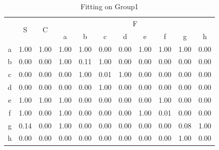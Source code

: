 \begin{table}[]
\centering
\begin{tabular}{c|c|c|cccccccc}
\toprule
\multirow{2}{*}{} & \multirow{2}{*}{S} & \multirow{2}{*}{C} & \multicolumn{8}{c}{F}                                 \\ \cmidrule{4-11}
                  &                    &                    & a    & b    & c    & d    & e    & f    & g    & h    \\ \midrule
a                 & 1.00               & 1.00               & 1.00 & 1.00 & 0.00 & 0.00 & 1.00 & 1.00 & 1.00 & 0.00 \\
b                 & 0.00               & 0.00               & 1.00 & 0.11 & 1.00 & 0.00 & 0.00 & 0.00 & 0.00 & 0.00 \\
c                 & 0.00               & 0.00               & 0.00 & 1.00 & 0.01 & 1.00 & 0.00 & 0.00 & 0.00 & 0.00 \\
d                 & 0.00               & 0.00               & 0.00 & 0.00 & 1.00 & 0.00 & 0.00 & 0.00 & 0.00 & 0.00 \\
e                 & 1.00               & 1.00               & 1.00 & 0.00 & 0.00 & 0.00 & 0.00 & 1.00 & 0.00 & 0.00 \\
f                 & 1.00               & 0.00               & 1.00 & 0.00 & 0.00 & 0.00 & 1.00 & 0.01 & 0.00 & 0.00 \\
g                 & 0.14               & 0.00               & 1.00 & 0.00 & 0.00 & 0.00 & 0.00 & 0.00 & 0.08 & 1.00 \\
h                 & 0.00               & 0.00               & 0.00 & 0.00 & 0.00 & 0.00 & 0.00 & 0.00 & 1.00 & 0.00 \\ \bottomrule
\end{tabular}
\caption{Fitting on Group1}
\label{table:fitting-group-1}
\end{table}

